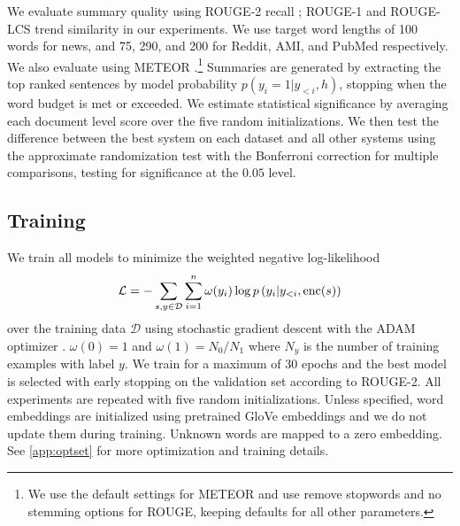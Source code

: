 
We evaluate summary quality using ROUGE-2 recall \cite{lin2004rouge};
ROUGE-1 and ROUGE-LCS trend similarity in our experiments.
We use target word lengths of 100 words for news, and 
75, 290, and 200 for Reddit, AMI, and PubMed respectively.
We also evaluate using METEOR \cite{denkowski:lavie:meteor-wmt:2014}.\footnote{We use the default settings for METEOR and use remove stopwords and no stemming options for ROUGE, keeping defaults for all other parameters.}
Summaries are generated by extracting the top ranked sentences by model probability $p(y_i=1|y_{<i},h)$, stopping when the word budget is met or exceeded.
We estimate statistical significance by averaging each document level score
over the five random initializations. 
We then test the difference between the best system on each dataset and 
all other systems using the approximate randomization test 
\cite{riezler2005some} with the Bonferroni correction for multiple comparisons,
testing for significance at the $0.05$ level. 

\subsection{Training}

We train all models to minimize the weighted negative log-likelihood
\[\mathcal{L} = -\sum_{s,y\in \mathcal{D}} \sum_{i=1}^\docSize \omega(y_i) \log p\left(y_i|y_{<i},
\operatorname{enc}(\sent)\right)\]
over the training data $\mathcal{D}$
using stochastic gradient descent with the ADAM optimizer
\cite{kingma2014adam}.
$\omega(0)=1$ and $\omega(1) = N_0/N_1$ where $N_y$ is the number of 
training examples with label $y$.
    We train for a maximum of 30 epochs and the best
    model is selected with early stopping on the validation set according
    to ROUGE-2. All experiments are repeated with five random
    initializations.     Unless specified, word embeddings are initialized 
    using pretrained GloVe embeddings \cite{pennington2014glove} and we do 
    not update them during training. Unknown words are mapped to a zero 
    embedding.
    See \autoref{app:optset} for more optimization and training details.


